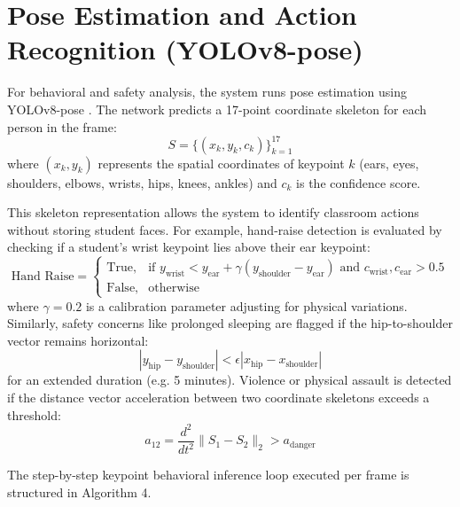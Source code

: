 \documentclass[12pt,a4paper,oneside]{report}
\begin{document}
\section{Pose Estimation and Action Recognition (YOLOv8-pose)}
For behavioral and safety analysis, the system runs pose estimation using YOLOv8-pose \cite{redmon2016you}. The network predicts a 17-point coordinate skeleton for each person in the frame:
\begin{equation}
    S = \{ (x_k, y_k, c_k) \}_{k=1}^{17}
\end{equation}
where $(x_k, y_k)$ represents the spatial coordinates of keypoint $k$ (ears, eyes, shoulders, elbows, wrists, hips, knees, ankles) and $c_k$ is the confidence score.

This skeleton representation allows the system to identify classroom actions without storing student faces. For example, hand-raise detection is evaluated by checking if a student's wrist keypoint lies above their ear keypoint:
\begin{equation}
    \text{Hand Raise} = \begin{cases}
        \text{True}, & \text{if } y_{\text{wrist}} < y_{\text{ear}} + \gamma (y_{\text{shoulder}} - y_{\text{ear}}) \text{ and } c_{\text{wrist}}, c_{\text{ear}} > 0.5 \\
        \text{False}, & \text{otherwise}
    \end{cases}
\end{equation}
where $\gamma = 0.2$ is a calibration parameter adjusting for physical variations. Similarly, safety concerns like prolonged sleeping are flagged if the hip-to-shoulder vector remains horizontal:
\begin{equation}
    |y_{\text{hip}} - y_{\text{shoulder}}| < \epsilon |x_{\text{hip}} - x_{\text{shoulder}}|
\end{equation}
for an extended duration (e.g. 5 minutes). Violence or physical assault is detected if the distance vector acceleration between two coordinate skeletons exceeds a threshold:
\begin{equation}
    a_{12} = \frac{d^2}{dt^2} \|S_1 - S_2\|_2 > a_{\text{danger}}
\end{equation}

The step-by-step keypoint behavioral inference loop executed per frame is structured in Algorithm 4.
\end{document}
